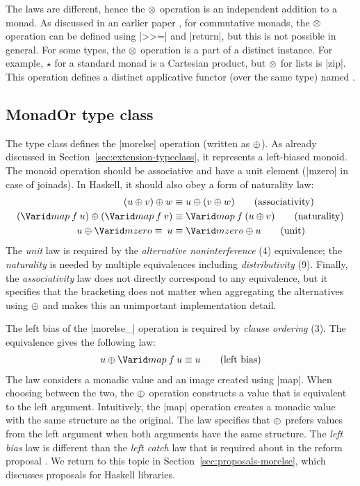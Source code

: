 \documentclass{sigplanconf}
\begin{document}
The laws are different, hence the $\otimes$ operation is an independent addition to a monad. As 
discussed in an earlier paper \cite{joinads}, for commutative monads, the $\otimes$ operation can be 
defined using |>>=| and |return|, but this is not possible in general. For some types, the $\otimes$ 
operation is a part of a distinct  instance. For example, $\star$ for a standard 
 monad is a Cartesian product, but $\otimes$ for lists is |zip|. This operation defines 
a distinct applicative functor (over the same type) named .


\subsection{MonadOr type class}
\label{sec:laws-monador}

The  type class defines the |morelse| operation (written as $\oplus$). As
already discussed in Section~\ref{sec:extension-typeclass}, it represents a left-biased monoid.
The monoid operation should be associative and have a unit element (|mzero| in case of joinads). 
In Haskell, it should also obey a form of naturality law:
\begin{align*}
  (u \morelse v) \morelse w &\equiv u \morelse (v \morelse w) \tag{associativity} \\
  (\map \: f \: u) \morelse (\map \: f \: v) &\equiv \map \: f \: (u \morelse v) \tag{naturality} \\
  u \morelse \mzero \equiv \: u &\equiv \mzero \morelse u \tag{unit}
\end{align*}
The \textit{unit} law is required by the \textit{alternative noninterference} (4) equivalence; 
the \textit{naturality} is needed by multiple equivalences including \textit{distributivity} (9).
Finally, the \textit{associativity} law does not directly correspond to any equivalence, but it 
specifies that the bracketing does not matter when aggregating the alternatives using $\oplus$
and makes this an unimportant implementation detail.

The left bias of the |morelse_| operation is required by \textit{clause ordering} (3).
The equivalence gives the following law:
\begin{align*}
  u \morelse \map \: f \: u \equiv u \tag{left bias}
\end{align*}
The law considers a monadic value and an image created using |map|. When choosing 
between the two, the $\oplus$ operation constructs a value that is equivalent to the left 
argument. Intuitively, the |map| operation creates a monadic value with the same structure as the 
original. The law specifies that $\oplus$ prefers values from the left argument when both 
arguments have the same structure.
The \textit{left bias} law is different than the \textit{left catch} law that is 
required about  in the  reform proposal \cite{monadplusreform}. 
We return to this topic in Section~\ref{sec:proposals-morelse}, which discusses proposals for 
Haskell libraries.
\end{document}
